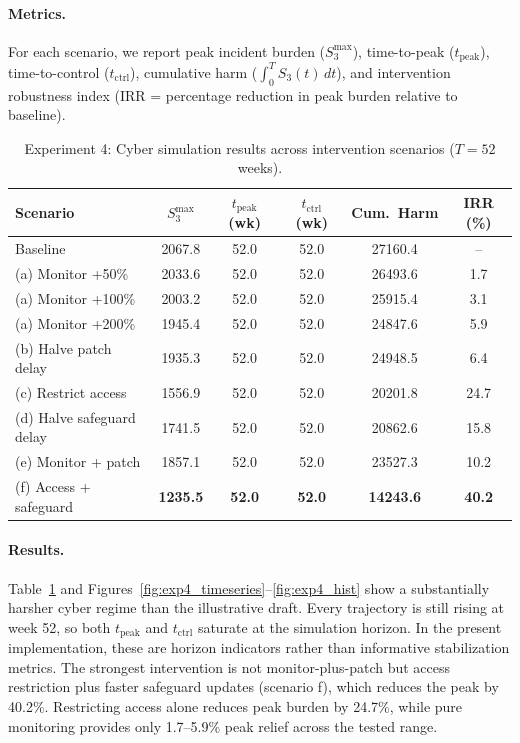 \documentclass[11pt]{article}
\begin{document}
\paragraph{Metrics.} For each scenario, we report peak incident burden ($S_3^{\max}$), time-to-peak ($t_{\text{peak}}$), time-to-control ($t_{\text{ctrl}}$), cumulative harm ($\int_0^T S_3(t)\,dt$), and intervention robustness index (IRR = percentage reduction in peak burden relative to baseline).

\begin{table}[t]
\centering
\caption{Experiment 4: Cyber simulation results across intervention scenarios ($T = 52$ weeks).}
\label{tab:exp4}
\small
\begin{tabular}{@{}lccccc@{}}
\toprule
\textbf{Scenario} & $S_3^{\max}$ & $t_{\text{peak}}$ (wk) & $t_{\text{ctrl}}$ (wk) & Cum.\ Harm & IRR (\%) \\
\midrule
Baseline & 2067.8 & 52.0 & 52.0 & 27160.4 & -- \\
(a) Monitor +50\% & 2033.6 & 52.0 & 52.0 & 26493.6 & 1.7 \\
(a) Monitor +100\% & 2003.2 & 52.0 & 52.0 & 25915.4 & 3.1 \\
(a) Monitor +200\% & 1945.4 & 52.0 & 52.0 & 24847.6 & 5.9 \\
(b) Halve patch delay & 1935.3 & 52.0 & 52.0 & 24948.5 & 6.4 \\
(c) Restrict access & 1556.9 & 52.0 & 52.0 & 20201.8 & 24.7 \\
(d) Halve safeguard delay & 1741.5 & 52.0 & 52.0 & 20862.6 & 15.8 \\
(e) Monitor + patch & 1857.1 & 52.0 & 52.0 & 23527.3 & 10.2 \\
(f) Access + safeguard & \textbf{1235.5} & \textbf{52.0} & \textbf{52.0} & \textbf{14243.6} & \textbf{40.2} \\
\bottomrule
\end{tabular}
\end{table}

\paragraph{Results.} Table~\ref{tab:exp4} and Figures~\ref{fig:exp4_timeseries}--\ref{fig:exp4_hist} show a substantially harsher cyber regime than the illustrative draft. Every trajectory is still rising at week 52, so both $t_{\text{peak}}$ and $t_{\text{ctrl}}$ saturate at the simulation horizon. In the present implementation, these are horizon indicators rather than informative stabilization metrics. The strongest intervention is not monitor-plus-patch but access restriction plus faster safeguard updates (scenario f), which reduces the peak by 40.2\%. Restricting access alone reduces peak burden by 24.7\%, while pure monitoring provides only 1.7--5.9\% peak relief across the tested range.
\end{document}
